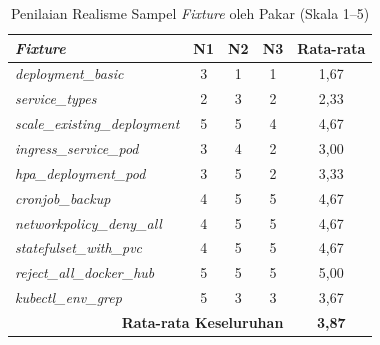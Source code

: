 \renewcommand{\arraystretch}{1.3}
\captionsetup[table]{justification=raggedright,singlelinecheck=false}
\begin{table}[H]
\caption{Penilaian Realisme Sampel \textit{Fixture} oleh Pakar (Skala 1--5)}
\label{tbl:fixture_ratings}
\centering
\begin{tabular}{| p{} | c | c | c | c |}
\hline
\textbf{\textit{Fixture}} & \textbf{N1} & \textbf{N2} & \textbf{N3} & \textbf{Rata-rata} \\
\hline
\textit{deployment\_basic} & 3 & 1 & 1 & 1,67 \\
\hline
\textit{service\_types} & 2 & 3 & 2 & 2,33 \\
\hline
\textit{scale\_existing\_deployment} & 5 & 5 & 4 & 4,67 \\
\hline
\textit{ingress\_service\_pod} & 3 & 4 & 2 & 3,00 \\
\hline
\textit{hpa\_deployment\_pod} & 3 & 5 & 2 & 3,33 \\
\hline
\textit{cronjob\_backup} & 4 & 5 & 5 & 4,67 \\
\hline
\textit{networkpolicy\_deny\_all} & 4 & 5 & 5 & 4,67 \\
\hline
\textit{statefulset\_with\_pvc} & 4 & 5 & 5 & 4,67 \\
\hline
\textit{reject\_all\_docker\_hub} & 5 & 5 & 5 & 5,00 \\
\hline
\textit{kubectl\_env\_grep} & 5 & 3 & 3 & 3,67 \\
\hline
\multicolumn{4}{|r|}{\textbf{Rata-rata Keseluruhan}} & \textbf{3,87} \\
\hline
\end{tabular}
\end{table}
